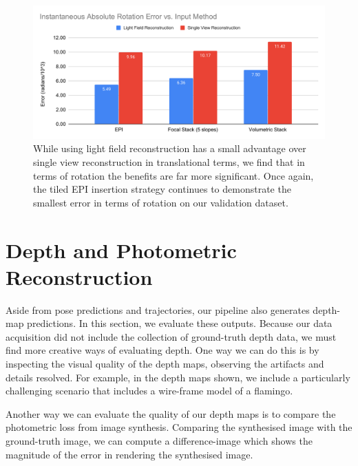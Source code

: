 \begin{figure}[H]
    \includegraphics[width=\textwidth]{images/result-examples/bargraphs/iare-vs-input-method.pdf}
    \caption{While using light field reconstruction has a small advantage over single view reconstruction  in translational terms, we find that in terms of rotation the benefits are far more significant. Once again, the tiled EPI insertion strategy continues to demonstrate the smallest error in terms of rotation on our validation dataset.}
\end{figure}
\section{Depth and Photometric Reconstruction}

Aside from pose predictions and trajectories, our pipeline also generates depth-map predictions. In this section, we evaluate these outputs. Because our data acquisition did not include the collection of ground-truth depth data, we must find more creative ways of evaluating depth. One way we can do this is by inspecting the visual quality of the depth maps, observing the artifacts and details resolved. For example, in the depth maps shown, we include a particularly challenging scenario that includes a wire-frame model of a flamingo. 

Another way we can evaluate the quality of our depth maps is to compare the photometric loss from image synthesis. Comparing the synthesised image with the ground-truth image, we can compute a difference-image which shows the magnitude of the error in rendering the synthesised image.



